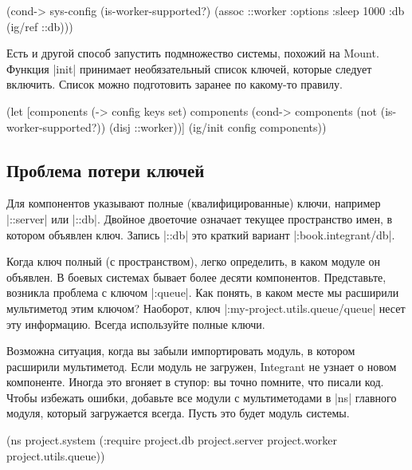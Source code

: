 \begin{english}
  \begin{clojure}
(cond-> sys-config
  (is-worker-supported?)
  (assoc ::worker {:options {:sleep 1000}
                   :db (ig/ref ::db)}))
  \end{clojure}
\end{english}

Есть и другой способ запустить подмножество системы, похожий на
Mount. Функция \spverb|init| принимает необязательный список ключей,
которые следует включить. Список можно подготовить заранее по какому-то правилу.

\begin{english}
  \begin{clojure}
(let [components (-> config keys set)
      components (cond-> components
                   (not (is-worker-supported?))
                   (disj ::worker))]
  (ig/init config components))
  \end{clojure}
\end{english}

\subsection{Проблема потери ключей}

Для компонентов указывают полные (квалифицированные) ключи, например
\spverb|::server| или \spverb|::db|. Двойное двоеточие означает текущее
пространство имен, в котором объявлен ключ. Запись \spverb|::db| это краткий
вариант \spverb|:book.integrant/db|.

Когда ключ полный (с пространством), легко определить, в каком модуле он
объявлен. В боевых системах бывает более десяти компонентов. Представьте,
возникла проблема с ключом \spverb|:queue|. Как понять, в каком месте мы
расширили мультиметод этим ключом? Наоборот, ключ
\spverb|:my-project.utils.queue/queue| несет эту информацию. Всегда используйте
полные ключи.

Возможна ситуация, когда вы забыли импортировать модуль, в котором расширили
мультиметод. Если модуль не загружен, Integrant не узнает о новом
компоненте. Иногда это вгоняет в ступор: вы точно помните, что писали код. Чтобы
избежать ошибки, добавьте все модули с мультиметодами в \spverb|ns| главного
модуля, который загружается всегда. Пусть это будет модуль системы.

\begin{english}
  \begin{clojure}
(ns project.system
  (:require project.db
            project.server
            project.worker
            project.utils.queue))
  \end{clojure}
\end{english}

